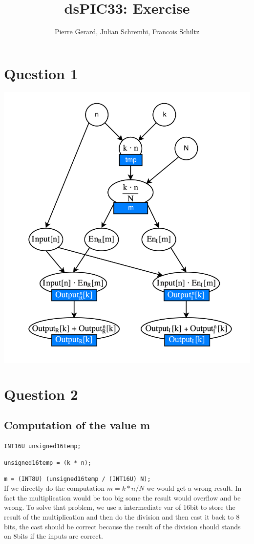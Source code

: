 \documentclass[a4paper]{article}
\title{dsPIC33: Exercise}
\author{Pierre Gerard, Julian Schrembi, Francois Schiltz}
\begin{document}
\maketitle

\section{Question 1}

\includegraphics[scale=1]{files/elect-01.png} 

\section{Question 2}

\subsection{Computation of the value m}


\verb|INT16U unsigned16temp;|

\verb|unsigned16temp = (k * n);|

\verb|m = (INT8U) (unsigned16temp / (INT16U) N);|
\\

If we directly do the computation $ m = k*n/N $ we would get a wrong result. In fact the multiplication would be too big some the result would overflow and be wrong. To solve that problem, we use a intermediate var of 16bit to store the result of the multiplication and then do the division and then cast it back to 8 bits, the cast should be correct because the result of the division should stands on 8bits if the inputs are correct.
\end{document}
